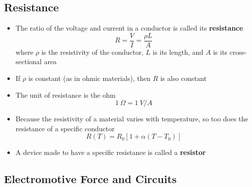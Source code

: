 \documentclass{article}
\begin{document}
\subsection{Resistance}

\begin{itemize}
  \item The ratio of the voltage and current in a conductor is called its \textbf{resistance} \[R = \frac{V}{I} = \frac{\rho L}{A}\] where $\rho$ is the resistivity of the conductor, $L$ is its length, and $A$ is its cross-sectional area

  \item If $\rho$ is constant (as in ohmic materials), then $R$ is also constant

  \item The unit of resistance is the ohm \[\qty{1}{\Omega} = \qty{1}{V/A}\]

  \item Because the resistivity of a material varies with temperature, so too does the resistance of a specific conductor \[R(T) = R_0 [1 + \alpha (T - T_0)]\]

  \item A device made to have a specific resistance is called a \textbf{resistor}
\end{itemize}

\subsection{Electromotive Force and Circuits}
\end{document}
